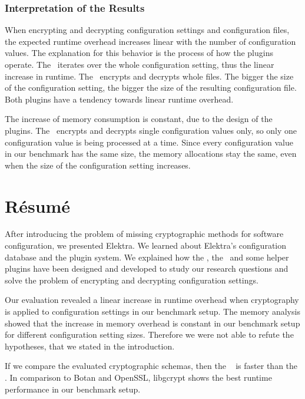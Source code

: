	\subsection{Interpretation of the Results}

When encrypting and decrypting configuration settings and configuration files, the expected runtime overhead increases linear with the number of configuration values.
The explanation for this behavior is the process of how the plugins operate.
The \crypto ~iterates over the whole configuration setting, thus the linear increase in runtime.
The \fcrypt ~encrypts and decrypts whole files.
The bigger the size of the configuration setting, the bigger the size of the resulting configuration file.
Both plugins have a tendency towards linear runtime overhead.

The increase of memory consumption is constant, due to the design of the plugins.
The \crypto ~encrypts and decrypts single configuration values only, so only one configuration value is being processed at a time.
Since every configuration value in our benchmark has the same size, the memory allocations stay the same, even when the size of the configuration setting increases.

\chapter{Résumé}

After introducing the problem of missing cryptographic methods for software configuration, we presented Elektra.
We learned about Elektra's configuration database and the plugin system.
We explained how the \crypto, the \fcrypt ~and some helper plugins have been designed and developed to study our research questions and solve the problem of encrypting and decrypting configuration settings.

Our evaluation revealed a linear increase in runtime overhead when cryptography is applied to configuration settings in our benchmark setup.
The memory analysis showed that the increase in memory overhead is constant in our benchmark setup for different configuration setting sizes.
Therefore we were not able to refute the hypotheses, that we stated in the introduction.

If we compare the evaluated cryptographic schemas, then the \fcrypt~ is faster than the \crypto.
In comparison to Botan and OpenSSL, libgcrypt shows the best runtime performance in our benchmark setup.
